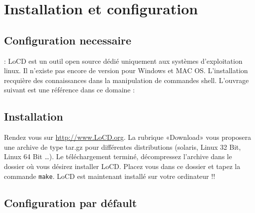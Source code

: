 \chapter{Installation et configuration}

\section{Configuration necessaire}
\danger : LoCD est un outil open source dédié uniquement aux systèmes d'exploitation linux. Il n'existe pas encore de version pour Windows et MAC OS. L'installation recquière des connaissances dans la manipulation de commandes shell. L'ouvrage suivant est une référence dans ce domaine : \cite{Nutshell}    

\section{Installation}
\label{sec:install}
Rendez vous sur \url{http://www.LoCD.org}. La rubrique «Download» vous proposera une archive de type tar.gz pour différentes distributions (solaris, Linux 32 Bit, Linux 64 Bit \dots ). Le téléchargement terminé, décompressez l'archive dans le dossier où vous désirez installer LoCD. Placez vous dans ce dossier et tapez la commande \verb+make+. LoCD est maintenant installé sur votre ordinateur \smiley !!  


\section{Configuration par défault}
\label{sec:def}
